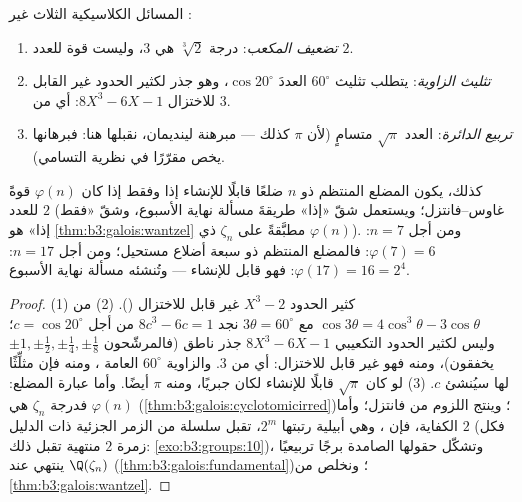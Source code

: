 \begin{corollary}\label{cor:b3:galois:impossible}
المسائل الكلاسيكية الثلاث غير  :
\begin{enumerate}
  \item \emph{تضعيف المكعب}: درجة $\sqrt[3]2$ هي $3$، وليست قوة
        للعدد $2$.
  \item \emph{تثليث الزاوية}: يتطلب تثليث $60^\circ$ العددَ
        $\cos 20^\circ$، وهو جذر لكثير الحدود غير القابل
        للاختزال $8X^3
        - 6X - 1$: أي من  $3$.
  \item \emph{تربيع الدائرة}: العدد $\sqrt\pi$ متسامٍ (لأن $\pi$
        كذلك --- مبرهنة لينديمان، نقبلها هنا: فبرهانها يخص مقرّرًا
        في نظرية التسامي).
\end{enumerate}
كذلك، يكون المضلع المنتظم ذو $n$ ضلعًا قابلًا للإنشاء إذا وفقط
إذا كان $\varphi(n)$ قوةً للعدد $2$ (غاوس--فانتزل؛ ويستعمل شقّ
«إذا» طريقةَ مسألة نهاية الأسبوع، وشقّ «فقط إذا» هو \cref{thm:b3:galois:wantzel}
مطبَّقةً على $\zeta_n$ ذي  $\varphi(n)$). ومن أجل $n = 7$:
$\varphi(7) = 6$: فالمضلع المنتظم ذو سبعة أضلاع مستحيل؛ ومن أجل
$n = 17$: $\varphi(17) = 16 = 2^4$: فهو قابل للإنشاء --- وتُنشئه مسألة نهاية
الأسبوع.
\end{corollary}

\begin{proof}
(1) كثير الحدود $X^3 - 2$ غير قابل للاختزال (). (2) من
$\cos
3\theta = 4\cos^3\theta - 3\cos\theta$ مع $3\theta =
60^\circ$ نجد $8c^3 - 6c = 1$ من أجل $c = \cos 20^\circ$؛ وليس
لكثير الحدود التكعيبي $8X^3 - 6X - 1$ جذر ناطق (فالمرشّحون
$\pm1, \pm\frac
12, \pm\frac14, \pm\frac18$ يخفقون)، ومنه فهو غير قابل للاختزال: أي من  $3$.
والزاوية $60^\circ$ العامة ، ومنه فإن مثلِّثًا لها
سيُنشئ $c$. (3) لو كان $\sqrt\pi$ قابلًا للإنشاء لكان جبريًا،
ومنه $\pi$ أيضًا. وأما عبارة المضلع: فدرجة $\zeta_n$ هي
$\varphi(n)$ (\cref{thm:b3:galois:cyclotomicirred})؛ وينتج اللزوم من فانتزل؛ وأما
الكفاية، فإن ، وهي أبيلية رتبتها $2^m$، تقبل سلسلة من
الزمر الجزئية ذات الدليل $2$ (فكل زمرة $2$ منتهية تقبل ذلك:
\cref{exo:b3:groups:10})، وتشكّل حقولها الصامدة برجًا تربيعيًا ينتهي عند
$\Q(\zeta_n)$ (\cref{thm:b3:galois:fundamental})؛ ونخلص من \cref{thm:b3:galois:wantzel}.
\end{proof}

